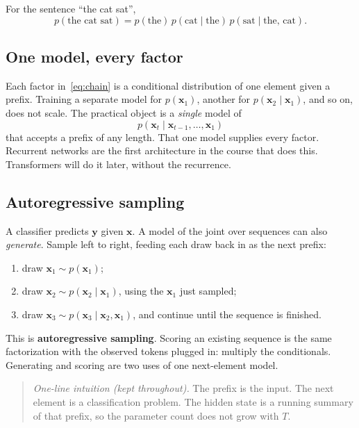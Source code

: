 \documentclass[11pt]{article}
\begin{document}
For the sentence ``the cat sat'',
\[
p(\text{the cat sat})
=
p(\text{the})\,
p(\text{cat}\mid\text{the})\,
p(\text{sat}\mid\text{the, cat}).
\]

\subsection{One model, every factor}

Each factor in~\eqref{eq:chain} is a conditional distribution of one element
given a prefix. Training a separate model for \(p(\mathbf{x}_1)\), another
for \(p(\mathbf{x}_2\mid\mathbf{x}_1)\), and so on, does not scale. The
practical object is a \emph{single} model of
\[
p(\mathbf{x}_t\mid\mathbf{x}_{t-1},\ldots,\mathbf{x}_1)
\]
that accepts a prefix of any length. That one model supplies every factor.
Recurrent networks are the first architecture in the course that does this.
Transformers will do it later, without the recurrence.

\subsection{Autoregressive sampling}

A classifier predicts \(\mathbf{y}\) given \(\mathbf{x}\). A model of the
joint over sequences can also \emph{generate}. Sample left to right, feeding
each draw back in as the next prefix:
\begin{enumerate}[leftmargin=*]
  \item draw \(\mathbf{x}_1\sim p(\mathbf{x}_1)\);
  \item draw \(\mathbf{x}_2\sim p(\mathbf{x}_2\mid\mathbf{x}_1)\), using the
        \(\mathbf{x}_1\) just sampled;
  \item draw \(\mathbf{x}_3\sim p(\mathbf{x}_3\mid\mathbf{x}_2,\mathbf{x}_1)\),
        and continue until the sequence is finished.
\end{enumerate}
This is \textbf{autoregressive sampling}. Scoring an existing sequence is
the same factorization with the observed tokens plugged in: multiply the
conditionals. Generating and scoring are two uses of one next-element model.

\begin{quote}
\emph{One-line intuition (kept throughout).}
The prefix is the input. The next element is a classification problem.
The hidden state is a running summary of that prefix, so the parameter
count does not grow with \(T\).
\end{quote}
\end{document}
